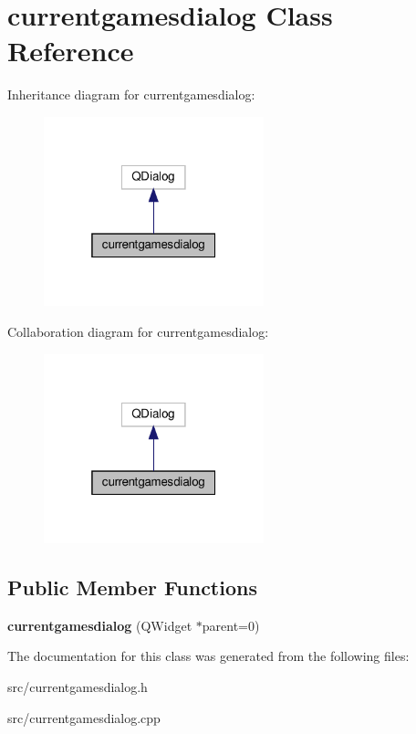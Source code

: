 \hypertarget{classcurrentgamesdialog}{}\section{currentgamesdialog Class Reference}
\label{classcurrentgamesdialog}


Inheritance diagram for currentgamesdialog\+:\nopagebreak
\begin{figure}[H]
\begin{center}
\leavevmode
\includegraphics[width=181pt]{classcurrentgamesdialog__inherit__graph}
\end{center}
\end{figure}


Collaboration diagram for currentgamesdialog\+:\nopagebreak
\begin{figure}[H]
\begin{center}
\leavevmode
\includegraphics[width=181pt]{classcurrentgamesdialog__coll__graph}
\end{center}
\end{figure}
\subsection*{Public Member Functions}
\begin{DoxyCompactItemize}
\item 
\mbox{\label{classcurrentgamesdialog_a51d424ef123e1a040d859ee7fd94f2c3}} 
{\bfseries currentgamesdialog} (Q\+Widget $\ast$parent=0)
\end{DoxyCompactItemize}


The documentation for this class was generated from the following files\+:\begin{DoxyCompactItemize}
\item 
src/currentgamesdialog.\+h\item 
src/currentgamesdialog.\+cpp\end{DoxyCompactItemize}
